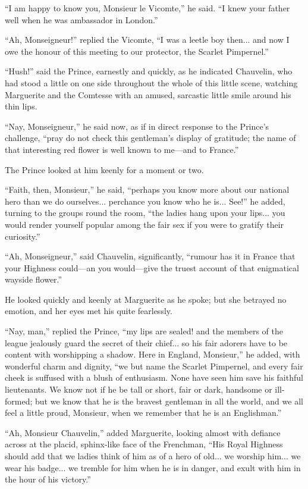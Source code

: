 \enquote{I am happy to know you, Monsieur le Vicomte,} he said. \enquote{I knew your father well when he was ambassador in London.}

\enquote{Ah, Monseigneur!} replied the Vicomte, \enquote{I was a leetle boy then... and now I owe the honour of this meeting to our protector, the Scarlet Pimpernel.}

\enquote{Hush!} said the Prince, earnestly and quickly, as he indicated Chauvelin, who had stood a little on one side throughout the whole of this little scene, watching Marguerite and the Comtesse with an amused, sarcastic little smile around his thin lips.

\enquote{Nay, Monseigneur,} he said now, as if in direct response to the Prince's challenge, \enquote{pray do not check this gentleman's display of gratitude; the name of that interesting red flower is well known to me---and to France.}

The Prince looked at him keenly for a moment or two.

\enquote{Faith, then, Monsieur,} he said, \enquote{perhaps you know more about our national hero than we do ourselves... perchance you know who he is... See!} he added, turning to the groups round the room, \enquote{the ladies hang upon your lips... you would render yourself popular among the fair sex if you were to gratify their curiosity.}

\enquote{Ah, Monseigneur,} said Chauvelin, significantly, \enquote{rumour has it in France that your Highness could---an you would---give the truest account of that enigmatical wayside flower.}

He looked quickly and keenly at Marguerite as he spoke; but she betrayed no emotion, and her eyes met his quite fearlessly.

\enquote{Nay, man,} replied the Prince, \enquote{my lips are sealed! and the members of the league jealously guard the secret of their chief... so his fair adorers have to be content with worshipping a shadow. Here in England, Monsieur,} he added, with wonderful charm and dignity, \enquote{we but name the Scarlet Pimpernel, and every fair cheek is suffused with a blush of enthusiasm. None have seen him save his faithful lieutenants. We know not if he be tall or short, fair or dark, handsome or ill-formed; but we know that he is the bravest gentleman in all the world, and we all feel a little proud, Monsieur, when we remember that he is an Englishman.}

\enquote{Ah, Monsieur Chauvelin,} added Marguerite, looking almost with defiance across at the placid, sphinx-like face of the Frenchman, \enquote{His Royal Highness should add that we ladies think of him as of a hero of old... we worship him... we wear his badge... we tremble for him when he is in danger, and exult with him in the hour of his victory.}

